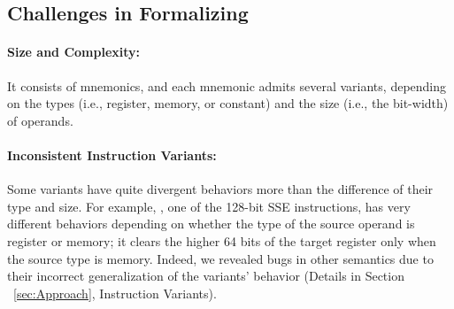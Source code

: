



\subsection{Challenges in Formalizing \ISA}
\label{sec:challenges-in-formalizing-x86}


\paragraph{Size and Complexity:}
%
It consists of \totalIntel{} mnemonics, and each mnemonic admits several variants, depending on the types (i.e., register, memory, or constant) and the size (i.e., the bit-width) of operands.

\paragraph{Inconsistent Instruction Variants:}
%
Some variants have quite divergent behaviors more than the difference of their type and size. For example, , one of the 128-bit SSE instructions, has very different behaviors depending on whether the type of the source operand is register or memory; it clears the higher 64 bits of the target register only when the source type is memory.
Indeed, we revealed bugs in other semantics due to their incorrect generalization of the variants' behavior (Details in Section ~\ref{sec:Approach}, Instruction Variants).

